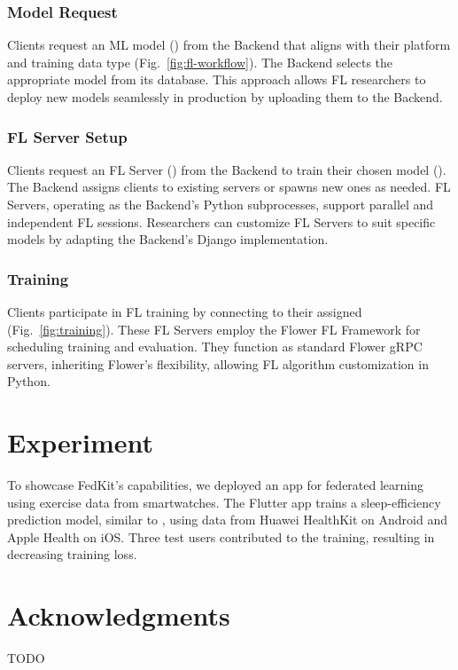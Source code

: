 \documentclass[letterpaper]{article} %
\begin{document}
\subsubsection{Model Request}
Clients request an ML model (\model{}) from the Backend that
aligns with their platform and training data type
(Fig.~\ref{fig:fl-workflow}).
The Backend selects the appropriate model from its database.
This approach allows FL researchers to deploy new models seamlessly
in production by uploading them to the Backend.

\subsubsection{FL Server Setup}
Clients request an FL Server (\fs{}) from the Backend to
train their chosen model (\model{}).
The Backend assigns clients to existing servers or spawns new ones as needed.
FL Servers, operating as the Backend's Python subprocesses,
support parallel and independent FL sessions.
Researchers can customize FL Servers to suit specific models by
adapting the Backend's Django implementation.

\subsubsection{Training}
Clients participate in FL training by connecting to their assigned \fs{}
(Fig.~\ref{fig:training}).
These FL Servers employ the Flower FL Framework for
scheduling training and evaluation.
They function as standard Flower gRPC servers,
inheriting Flower's flexibility,
allowing FL algorithm customization in Python.

\section{Experiment}
To showcase FedKit's capabilities,
we deployed an app for federated learning using exercise data from smartwatches.
The Flutter app trains a sleep-efficiency prediction model,
similar to \cite{khoa2022fedmcrnn},
using data from Huawei HealthKit on Android and Apple Health on iOS.
Three test users contributed to the training,
resulting in decreasing training loss.

\appendix

\section*{Acknowledgments}
TODO

\bigskip


\end{document}
